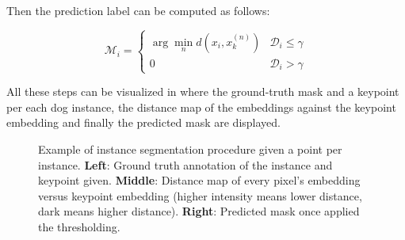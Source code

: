 Then the prediction label can be computed as follows:

\begin{equation}
  \mathcal{M}_i = \begin{cases}
      \arg\min_n d(x_i, x_k^{(n)}) & \mathcal{D}_i \leq \gamma \\
      0 & \mathcal{D}_i > \gamma
   \end{cases}
\end{equation}

All these steps can be visualized in  where the ground-truth mask and a keypoint per each dog instance, the distance map of the embeddings against the keypoint embedding and finally the predicted mask are displayed.

\begin{figure}[h]
  \centering
  \caption{Example of instance segmentation procedure given a point per instance.
  \textbf{Left}: Ground truth annotation of the instance and keypoint given.
  \textbf{Middle}: Distance map of every pixel's embedding versus keypoint embedding (higher intensity means lower distance, dark means higher distance).
  \textbf{Right}: Predicted mask once applied the thresholding. }
  \label{fig:instancesegmentation}
\end{figure}
